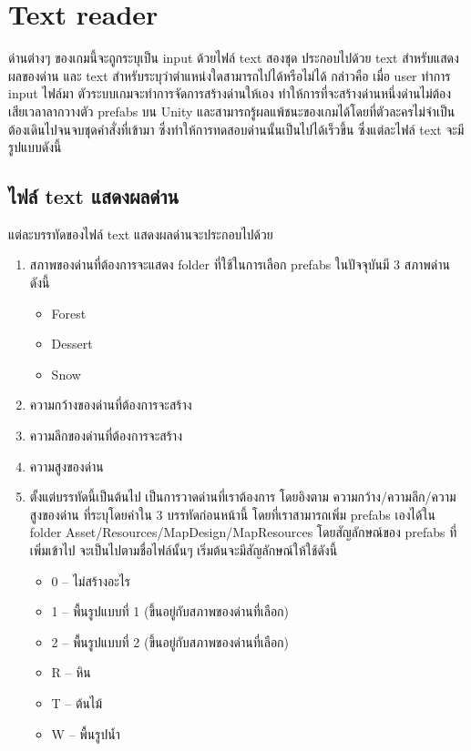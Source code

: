 \section{Text reader}
ด่านต่างๆ ของเกมนี้จะถูกระบุเป็น input ด้วยไฟล์ text สองชุด ประกอบไปด้วย text สำหรับแสดงผลของด่าน และ text สำหรับระบุว่าตำแหน่งใดสามารถไปได้หรือไม่ได้ กล่าวคือ เมื่อ user ทำการ input ไฟล์มา ตัวระบบเกมจะทำการจัดการสร้างด่านให้เอง
ทำให้การที่จะสร้างด่านหนึ่งด่านไม่ต้องเสียเวลาลากวางตัว prefabs บน Unity และสามารถรู้ผลแพ้ชนะของเกมได้โดยที่ตัวละครไม่จำเป็นต้องเดินไปจนจบชุดคำสั่งที่เข้ามา ซึ่งทำให้การทดสอบด่านนั้นเป็นไปได้เร็วขึ้น
ซึ่งแต่ละไฟล์ text จะมีรูปแบบดังนี้

\subsection{ไฟล์ text แสดงผลด่าน}
แต่ละบรรทัดของไฟล์ text แสดงผลด่านจะประกอบไปด้วย
\begin{enumerate}
    \item สภาพของด่านที่ต้องการจะแสดง folder ที่ใช้ในการเลือก prefabs ในปัจจุบันมี 3 สภาพด่าน ดังนี้
    \begin{itemize}
        \item Forest
        \item Dessert
        \item Snow
    \end{itemize}
    \item ความกว้างของด่านที่ต้องการจะสร้าง
    \item ความลึกของด่านที่ต้องการจะสร้าง
    \item ความสูงของด่าน
    \item ตั้งแต่บรรทัดนี้เป็นต้นไป เป็นการวาดด่านที่เราต้องการ โดยอิงตาม ความกว้าง/ความลึก/ความสูงของด่าน ที่ระบุโดยค่าใน 3 บรรทัดก่อนหน้านี้ โดยที่เราสามารถเพิ่ม prefabs เองได้ใน folder Asset/Resources/MapDesign/MapResources โดยสัญลักษณ์ของ prefabs ที่เพิ่มเข้าไป จะเป็นไปตามชื่อไฟล์นั้นๆ เริ่มต้นจะมีสัญลักษณ์ให้ใช้ดังนี้
    \begin{itemize}
        \item 0 -- ไม่สร้างอะไร
        \item 1 -- พื้นรูปแบบที่ 1 (ขึ้นอยู่กับสภาพของด่านที่เลือก)
        \item 2 -- พื้นรูปแบบที่ 2 (ขึ้นอยู่กับสภาพของด่านที่เลือก)
        \item R -- หิน
        \item T -- ต้นไม้
        \item W -- พื้นรูปน้ำ
    \end{itemize}
\end{enumerate}
